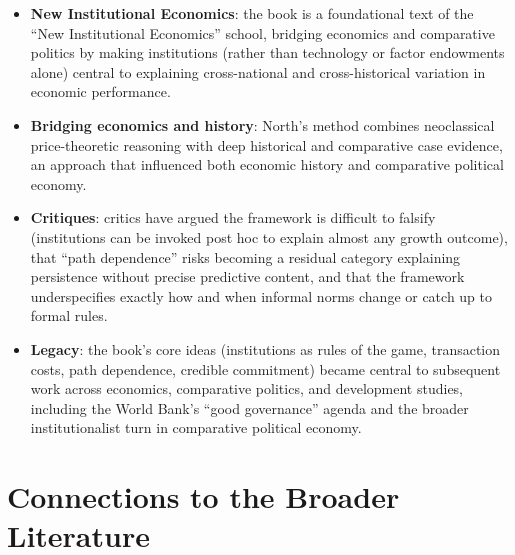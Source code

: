 \documentclass[12pt]{article}
\begin{document}
\begin{itemize}[leftmargin=*, itemsep=4pt]
    \item \textbf{New Institutional Economics}: the book is a foundational text of the ``New Institutional Economics'' school, bridging economics and comparative politics by making institutions (rather than technology or factor endowments alone) central to explaining cross-national and cross-historical variation in economic performance.
    \item \textbf{Bridging economics and history}: North's method combines neoclassical price-theoretic reasoning with deep historical and comparative case evidence, an approach that influenced both economic history and comparative political economy.
    \item \textbf{Critiques}: critics have argued the framework is difficult to falsify (institutions can be invoked post hoc to explain almost any growth outcome), that ``path dependence'' risks becoming a residual category explaining persistence without precise predictive content, and that the framework underspecifies exactly how and when informal norms change or catch up to formal rules.
    \item \textbf{Legacy}: the book's core ideas (institutions as rules of the game, transaction costs, path dependence, credible commitment) became central to subsequent work across economics, comparative politics, and development studies, including the World Bank's ``good governance'' agenda and the broader institutionalist turn in comparative political economy.
\end{itemize}

\section{Connections to the Broader Literature}
\end{document}
